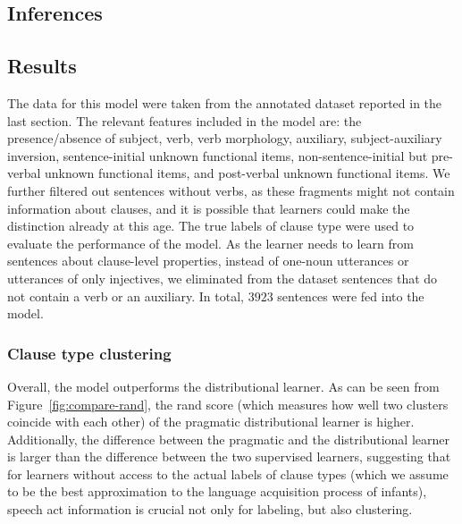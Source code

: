 \subsection{Inferences}
\label{sec:engcl:model:infer}

\subsection{Results}
\label{sec:engcl:model:results}
The data for this model were taken from the annotated dataset reported in the last section. The relevant features included in the model are: the presence/absence of subject, verb, verb morphology, auxiliary, subject-auxiliary inversion, sentence-initial unknown functional items, non-sentence-initial but pre-verbal unknown functional items, and post-verbal unknown functional items. We further filtered out sentences without verbs, as these fragments might not contain information about clauses, and it is possible that learners could make the distinction already at this age. The true labels of clause type were used to evaluate the performance of the model. As the learner needs to learn from sentences about clause-level properties, instead of one-noun utterances or utterances of only injectives, we eliminated from the dataset sentences that do not contain a verb or an auxiliary. In total, $3923$  sentences were fed into the model.


\subsubsection{Clause type clustering}
\label{sec:engcl:model:results:overview}


Overall, the model outperforms the distributional learner. As can be seen from Figure~\ref{fig:compare-rand}, the rand score (which measures how well two clusters coincide with each other) of the pragmatic distributional learner is higher. Additionally, the difference between the pragmatic and the distributional learner is larger than the difference between the two supervised learners, suggesting that for learners without access to the actual labels of clause types (which we assume to be the best approximation to the language acquisition process of infants), speech act information is crucial not only for labeling, but also clustering. 


